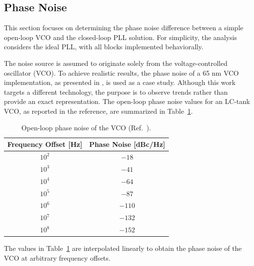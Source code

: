 \documentclass[lettersize,journal]{IEEEtran}
\begin{document}
\subsection{Phase Noise}
\label{sec:phase_noise}

This section focuses on determining the phase noise difference between a simple open-loop VCO and the closed-loop PLL solution. For simplicity, the analysis considers the ideal PLL, with all blocks implemented behaviorally. 

The noise source is assumed to originate solely from the voltage-controlled oscillator (VCO). To achieve realistic results, the phase noise of a 65 nm VCO implementation, as presented in \cite{vco}, is used as a case study. Although this work targets a different technology, the purpose is to observe trends rather than provide an exact representation. The open-loop phase noise values for an LC-tank VCO, as reported in the reference, are summarized in Table~\ref{tab:vco_phase_noise}. 

\begin{table}[!ht]
    \renewcommand{\arraystretch}{1.5}
    \centering
    \caption{Open-loop phase noise of the VCO (Ref.~\cite{vco}).}
    \label{tab:vco_phase_noise}
    \begin{tabular}{|c|c|}
        \hline
        \textbf{Frequency Offset [Hz]} & \textbf{Phase Noise [dBc/Hz]} \\ \hline
        \(10^2\)                        & \(-18\)                     \\ \hline
        \(10^3\)                        & \(-41\)                     \\ \hline
        \(10^4\)                        & \(-64\)                     \\ \hline
        \(10^5\)                        & \(-87\)                     \\ \hline
        \(10^6\)                        & \(-110\)                    \\ \hline
        \(10^7\)                        & \(-132\)                    \\ \hline
        \(10^8\)                        & \(-152\)                    \\ \hline
    \end{tabular}
\end{table}

The values in Table~\ref{tab:vco_phase_noise} are interpolated linearly to obtain the phase noise of the VCO at arbitrary frequency offsets.
\end{document}
